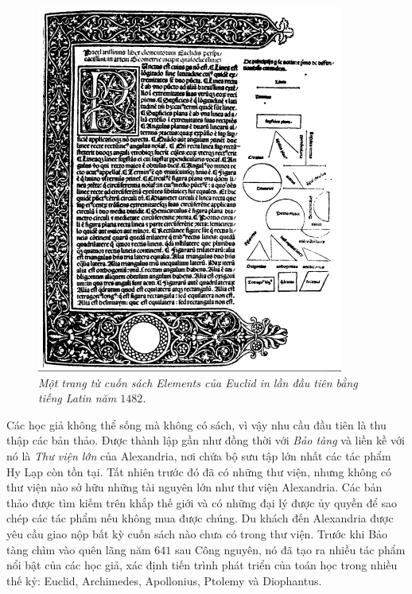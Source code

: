 \begin{multicols}{2}
\begin{figure}[H]
		\includegraphics[width= 1\linewidth]{2}
		\caption{\small\textit{\color{lichsutoanhoc}Một trang từ cuốn sách Elements của Euclid in lần đầu tiên bằng tiếng Latin năm $1482$.}}
		\vspace*{-10pt}
	\end{figure} 
	Các học giả không thể sống mà không có sách, vì vậy nhu cầu đầu tiên là thu thập các bản thảo. Được thành lập gần như đồng thời với \textit{Bảo tàng} và liền kề với nó là \textit{Thư viện lớn} của Alexandria, nơi chứa bộ sưu tập lớn nhất các tác phẩm Hy Lạp còn tồn tại. Tất nhiên trước đó đã có những thư viện, nhưng không có thư viện nào sở hữu những tài nguyên lớn như thư viện Alexandria. Các bản thảo được tìm kiếm trên khắp thế giới và có những đại lý được ủy quyền để sao chép các tác phẩm nếu không mua được chúng. Du khách đến Alexandria được yêu cầu giao nộp bất kỳ cuốn sách nào chưa có trong thư viện.
	\vskip 0.1cm
	Trước khi Bảo tàng chìm vào quên lãng năm $641$ sau Công nguyên, nó đã tạo ra nhiều tác phẩm nổi bật của các học giả, xác định tiến trình phát triển của toán học trong nhiều thế kỷ: Euclid, Archimedes, Apollonius, Ptolemy và Diophantus.

\end{multicols}
